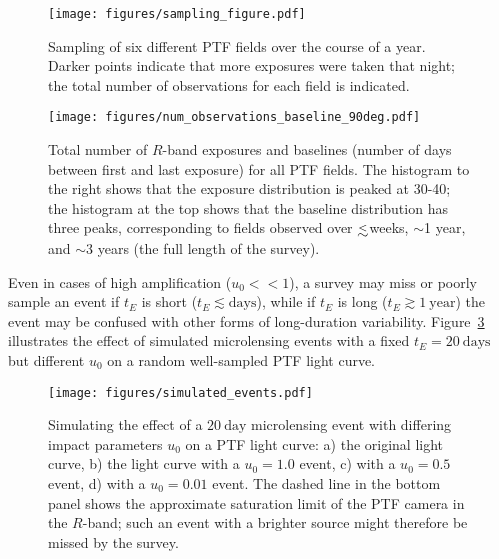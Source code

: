 \documentclass{emulateapj}
\newcommand{\lapprox }{{\lower0.8ex\hbox{$\buildrel <\over\sim$}}}
\begin{document}
\begin{figure}[!t]
\begin{center}
\texttt{[image: figures/sampling\_figure.pdf]}
\caption{Sampling of six different PTF fields over the course of a year. Darker points indicate that more exposures were taken that night; the total number of observations for each field is indicated.}\label{fig:sampling}
\end{center}
\end{figure}

\begin{figure}[h]
\centering\texttt{[image: figures/num\_observations\_baseline\_90deg.pdf]}
\caption{Total number of $R$-band exposures and baselines (number of days between first and last exposure) for all PTF fields. The histogram to the right shows that the exposure distribution is peaked at 30-40; the histogram at the top shows that the baseline distribution has three peaks, corresponding to fields observed over $\lapprox$weeks, $\sim$1 year, and $\sim$3 years (the full length of the survey).}
\label{fig:num_obs}
\end{figure}


Even in cases of high amplification ($u_0<<1$), a survey may miss or poorly sample an event if $t_E$ is short ($t_E \lesssim\mathrm{days}$), while if $t_E$ is long ($t_E \gtrsim 1~\mathrm{year}$) the event may be confused with other forms of long-duration variability. Figure~\ref{fig:microlensing_sim} illustrates the effect of simulated microlensing events with a fixed $t_E=20~\mathrm{days}$ but different $u_0$ on a random well-sampled PTF light curve. 

\begin{figure}[!h]
\centering\texttt{[image: figures/simulated\_events.pdf]}
\caption{Simulating the effect of a $20~\mathrm{day}$ microlensing event with differing impact parameters $u_0$ on a PTF light curve: a) the original light curve, b) the light curve with a $u_0=1.0$ event, c) with a $u_0=0.5$ event, d) with a $u_0=0.01$ event. The dashed line in the bottom panel shows the approximate saturation limit of the PTF camera in the $R$-band; such an event with a brighter source might therefore be missed by the survey.}\label{fig:microlensing_sim}
\end{figure}
\end{document}
